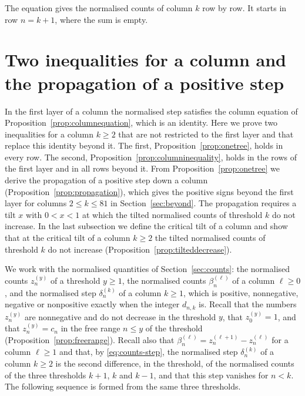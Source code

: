 \documentclass{amsart}
\makeatletter
\theoremstyle{definition}
\theoremstyle{remark}
\numberwithin{equation}{section}
\def\subsection{\@startsection{subsection}{2}\z@{.5\linespacing\@plus.7\linespacing}{-.5em}{\normalfont\bfseries\boldmath}}
\makeatother
\begin{document}
The equation gives the normalised counts of column $k$ row by row. It starts
in row $n=k+1$, where the sum is empty.

\section{Two inequalities for a column and the propagation of a positive step}\label{sec:propagation}
In the first layer of a column the normalised step satisfies the column
equation of Proposition~\ref{prop:columnequation}, which is an identity.
Here we prove two inequalities for a column $k\ge2$ that are not restricted
to the first layer and that replace this identity beyond it. The first,
Proposition~\ref{prop:onetree}, holds in every row. The second,
Proposition~\ref{prop:columninequality}, holds in the rows of the first
layer and in all rows beyond it. From
Proposition~\ref{prop:onetree} we derive the propagation of a positive step
down a column (Proposition~\ref{prop:propagation}), which gives the positive
signs beyond the first layer for columns $2\le k\le81$ in
Section~\ref{sec:beyond}. The propagation requires a tilt $x$ with $0<x<1$
at which the tilted normalised counts of threshold $k$ do not increase. In
the last subsection we define the critical tilt of a column and show that
at the critical tilt of a column $k\ge2$ the tilted normalised counts of
threshold $k$ do not increase (Proposition~\ref{prop:tilteddecrease}).

\subsection{The tree curvature of a column}\label{subsec:propagation-curvature}

We work with the normalised quantities of Section~\ref{sec:counts}: the
normalised counts $z^{(y)}_n$ of a threshold $y\ge1$, the normalised counts
$\beta^{(\ell)}_n$ of a column $\ell\ge0$, and the normalised step
$\delta^{(k)}_n$ of a column $k\ge1$, which is positive, nonnegative,
negative or nonpositive exactly when the integer $d_{n,k}$ is.
Recall that the numbers $z^{(y)}_n$ are nonnegative and do not decrease in
the threshold $y$, that $z^{(y)}_0=1$, and that $z^{(y)}_n=c_n$ in the free
range $n\le y$ of the threshold (Proposition~\ref{prop:freerange}). Recall
also that $\beta^{(\ell)}_n=z^{(\ell+1)}_n-z^{(\ell)}_n$ for a column
$\ell\ge1$ and that, by \eqref{eq:counts-step}, the normalised
step $\delta^{(k)}_n$ of a column $k\ge2$ is the second difference, in the
threshold, of the normalised counts of the three thresholds $k+1$, $k$ and
$k-1$, and that this step vanishes for $n<k$. The following sequence is
formed from the same three thresholds.
\end{document}
